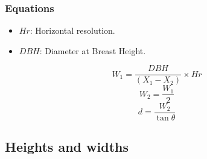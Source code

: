  \subsubsection{Equations}
 \begin{itemize}
	\item $Hr$: Horizontal resolution.
	\item $DBH$: Diameter at Breast Height.
\end{itemize}

\begin{equation}
	W_1 = \frac{DBH}{(X_1 - X_2)} \times Hr
	\label{w1}
\end{equation}
\begin{equation}
	W_2 = \frac{W_1}{2}
	\label{w2}
\end{equation}
\begin{equation}
	d = \frac{W_2}{\tan{\theta}}
	\label{d}
\end{equation}

\subsection{Heights and widths} 
